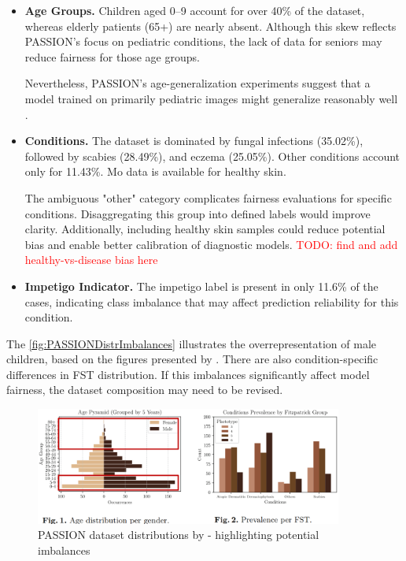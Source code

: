 \documentclass[12pt, a4paper, oneside]{book}   	%
\renewcommand{\todo}[1]{\textcolor{red}{TODO: #1}}
\begin{document}
\begin{itemize}
			
			\item \textbf{Age Groups.} Children aged 0–9 account for over 40\% of the dataset, whereas elderly patients (65+) are nearly absent. Although this skew reflects PASSION’s focus on \gls{pediatric} conditions, the lack of data for seniors may reduce fairness for those age groups.
			
			Nevertheless, PASSION's age-generalization experiments suggest that a model trained on primarily \gls{pediatric} images might generalize reasonably well \autocite{Gottfrois2024}.
			
			\item \textbf{Conditions.} The dataset is dominated by fungal infections (35.02\%), followed by scabies (28.49\%), and eczema (25.05\%). Other conditions account only for 11.43\%. Mo data is available for healthy skin.
			
			The ambiguous "other" category complicates fairness evaluations for specific conditions. Disaggregating this group into defined labels would improve clarity. Additionally, including healthy skin samples could reduce potential bias and enable better calibration of diagnostic models. \todo{find and add healthy-vs-disease bias here}
			
			\item \textbf{Impetigo Indicator.} The impetigo label is present in only 11.6\% of the cases, indicating class imbalance that may affect prediction reliability for this condition.
		\end{itemize}
		
		The \autoref{fig:PASSIONDistrImbalances} illustrates the overrepresentation of male children, based on the figures presented by \textcite{Gottfrois2024}. There are also condition-specific differences in \gls{FST} distribution. If this imbalances significantly affect model fairness, the dataset composition may need to be revised.
		
		\begin{figure}[H]
			\centering
			\includegraphics[width=0.9\textwidth]{figures/PASSIONDatasetDistributionPotentialImbalances.png}
			\caption{PASSION dataset distributions by \textcite{Gottfrois2024} - highlighting potential imbalances}
			\label{fig:PASSIONDistrImbalances}
		\end{figure}
		
\end{document}
